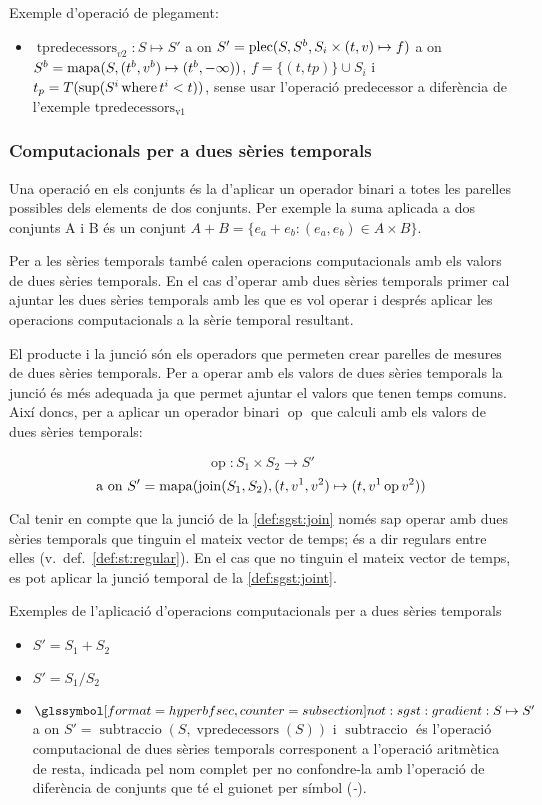 Exemple d'operació de plegament:
\begin{itemize}
\item $\operatorname{tpredecessors}_{v2}: S \mapsto S'$ a on $S'=
  \operatorname*{plec}(S,S^b,S_i\times (t,v) \mapsto f)$ a on $S^b =
  \operatorname*{mapa}(S,(t^b,v^b)\mapsto(t^b,-\infty))$, $f= \{(t,tp)\} \cup S_i$ i
  $t_p=T(\sup(S^i \operatorname*{where} t^i < t))$, sense usar l'operació predecessor
  a diferència de l'exemple $\operatorname{tpredecessors_{v1}}$
\end{itemize}




\subsubsection{Computacionals per a dues sèries temporals}

Una operació en els conjunts és la d'aplicar un operador binari a
totes les parelles possibles dels elements de dos conjunts. Per
exemple la suma aplicada a dos conjunts A i B és un conjunt $A + B =
\{ e_a+e_b : (e_a,e_b) \in A\times B \}$.

Per a les sèries temporals també calen operacions computacionals amb
els valors de dues sèries temporals. En el cas d'operar amb dues
sèries temporals primer cal ajuntar les dues sèries temporals amb les
que es vol operar i després aplicar les operacions computacionals a la
sèrie temporal resultant.


El producte i la junció són els operadors que permeten crear parelles
de mesures de dues sèries temporals. Per a operar amb els valors de
dues sèries temporals la junció és més adequada ja que permet ajuntar
el valors que tenen temps comuns. Així doncs, per a aplicar un
operador binari $\operatorname{op}$ que calculi amb els valors de
dues sèries temporals:

\[
\operatorname{op}: S_1 \times S_2 \longrightarrow S'
\]
\[
\text{a on } S' = \operatorname*{mapa}(\operatorname*{join}(S_1,S_2),(t,v^1,v^2)\mapsto(t,v^1
\operatorname{op} v^2))
\]

Cal tenir en compte que la junció de la \autoref{def:sgst:join} només
sap operar amb dues sèries temporals que tinguin el mateix vector de
temps; és a dir regulars entre elles (v.\
def.~\ref{def:st:regular}). En el cas que no tinguin el mateix vector
de temps, es pot aplicar la junció temporal de la
\autoref{def:sgst:joint}.


Exemples de l'aplicació d'operacions computacionals per a dues sèries
temporals
\begin{itemize}
\item $S' = S_1 + S_2$
\item $S' = S_1 / S_2$
\item $\glssymbolsec{not:sgst:gradient}: S \mapsto S'$ a on $S'=
  \operatorname{subtraccio}(S, \operatorname{vpredecessors}(S))$ i
  $\operatorname{subtraccio}$ és l'operació computacional de dues
  sèries temporals corresponent a l'operació aritmètica de resta,
  indicada pel nom complet per no confondre-la amb l'operació de diferència de
  conjunts que té el guionet per símbol (\emph{-}).
\end{itemize}









